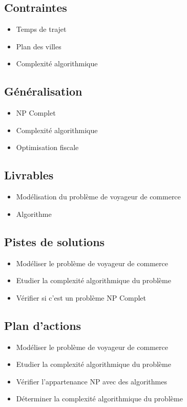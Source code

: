 \subsection*{Contraintes}
{}
\begin{itemize}
	\item Temps de trajet
	\item Plan des villes
	\item Complexité algorithmique
\end{itemize}

\subsection*{Généralisation}
{}
\begin{itemize}
	\item NP Complet
	\item Complexité algorithmique
	\item Optimisation fiscale
\end{itemize}

\subsection*{Livrables}
{}
\begin{itemize}
	\item Modélisation du problème de voyageur de commerce
	\item Algorithme
\end{itemize}

\subsection*{Pistes de solutions}
{}
\begin{itemize}
	\item Modéliser le problème de voyageur de commerce
	\item Etudier la complexité algorithmique du problème
	\item Vérifier si c'est un problème NP Complet
\end{itemize}

\subsection*{Plan d'actions}
{}
\begin{itemize}
	\item Modéliser le problème de voyageur de commerce
	\item Etudier la complexité algorithmique du problème
	\item Vérifier l'appartenance NP avec des algorithmes
	\item Déterminer la complexité algorithmique du problème
\end{itemize}

